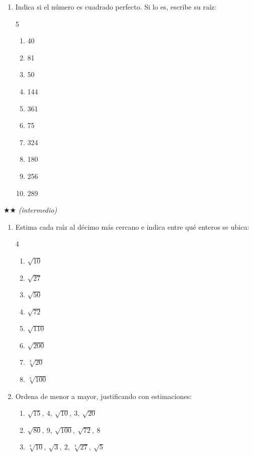 \documentclass[11pt, letterpaper]{article}
\begin{document}
\begin{enumerate}[label=\textbf{\arabic*.}, leftmargin=*]
  \item Indica si el número es cuadrado perfecto. Si lo es, escribe su raíz:
  \begin{multicols}{5}
  \begin{enumerate}[label=\alph*)]
    \item 40
    \item 81
    \item 50
    \item 144
    \item 361
    \item 75
    \item 324
    \item 180
    \item 256
    \item 289
  \end{enumerate}
  \end{multicols}
\end{enumerate}

$\bigstar\bigstar$ \textit{(intermedio)}

\begin{enumerate}[label=\textbf{\arabic*.}, leftmargin=*, resume]
  \item Estima cada raíz al décimo más cercano e indica entre qué enteros se ubica:
  \begin{multicols}{4}
  \begin{enumerate}[label=\alph*)]
    \item $\sqrt{10}$
    \item $\sqrt{27}$
    \item $\sqrt{50}$
    \item $\sqrt{72}$
    \item $\sqrt{110}$
    \item $\sqrt{200}$
    \item $\sqrt[3]{20}$
    \item $\sqrt[3]{100}$
  \end{enumerate}
  \end{multicols}

  \item Ordena de menor a mayor, justificando con estimaciones:
  \begin{enumerate}[label=\alph*)]
    \item $\sqrt{15},\ 4,\ \sqrt{10},\ 3,\ \sqrt{20}$
    \item $\sqrt{80},\ 9,\ \sqrt{100},\ \sqrt{72},\ 8$
    \item $\sqrt[3]{10},\ \sqrt{3},\ 2,\ \sqrt[3]{27},\ \sqrt{5}$
  \end{enumerate}
\end{enumerate}
\end{document}
